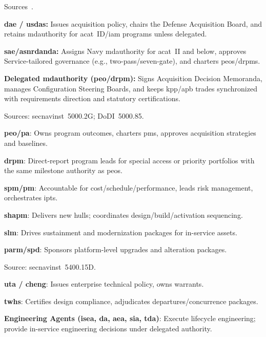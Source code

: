 \documentclass[../main.tex]{subfiles}
\begin{document}
\begin{description}[style=nextline, labelsep=0.5em, font=\bfseries]
  \item[\textbf{Acquisition decision authorities.}]
        Sources~\autocite{DoDD5000-01,DoDI5000-85,SECNAV5000-2G}.
        \begin{description}
          \item \textbf{\ac{dae} / \ac{usdas}:} Issues acquisition policy, chairs the Defense Acquisition Board, and retains \ac{mdauthority} for \ac{acat}~ID/\ac{iam} programs unless delegated.
          \item \textbf{\ac{sae}/\ac{asnrdanda}:} Assigns Navy \ac{mdauthority} for \ac{acat}~II and below, approves Service-tailored governance (e.g., two-pass/seven-gate), and charters \acp{peo}/\acp{drpm}.
          \item \textbf{Delegated \ac{mdauthority} (\ac{peo}/\ac{drpm}):} Signs Acquisition Decision Memoranda, manages Configuration Steering Boards, and keeps \ac{kpp}/\ac{apb} trades synchronized with requirements direction and statutory certifications.
        \end{description}

  \item[\textbf{Program Authority chain.}]
        Sources: \ac{secnavinst}~5000.2G; DoDI~5000.85.
        \begin{description}
          \item \textbf{\ac{peo}/\ac{pa}}: Owns program outcomes, charters \acp{pm}, approves acquisition strategies and baselines.
          \item \textbf{\ac{drpm}}: Direct-report program leads for special access or priority portfolios with the same milestone authority as \acp{peo}.
          \item \textbf{\ac{spm}/\ac{pm}}: Accountable for cost/schedule/performance, leads risk management, orchestrates \acp{ipt}.
          \item \textbf{\ac{shapm}}: Delivers new hulls; coordinates design/build/activation sequencing.
          \item \textbf{\ac{slm}}: Drives sustainment and modernization packages for in-service assets.
          \item \textbf{\ac{parm}/\ac{spd}}: Sponsors platform-level upgrades and alteration packages.
        \end{description}

  \item[\textbf{Technical Authority chain.}]
        Source: \ac{secnavinst}~5400.15D.
        \begin{description}
          \item \textbf{\ac{uta} / \ac{cheng}}: Issues enterprise technical policy, owns warrants.
          \item \textbf{\acp{twh}}: Certifies design compliance, adjudicates departures/concurrence packages.
          \item \textbf{Engineering Agents (\ac{isea}, \ac{da}, \ac{aea}, \ac{sia}, \ac{tda})}: Execute lifecycle engineering; provide in-service engineering decisions under delegated authority.
        \end{description}


\end{description}
\end{document}
